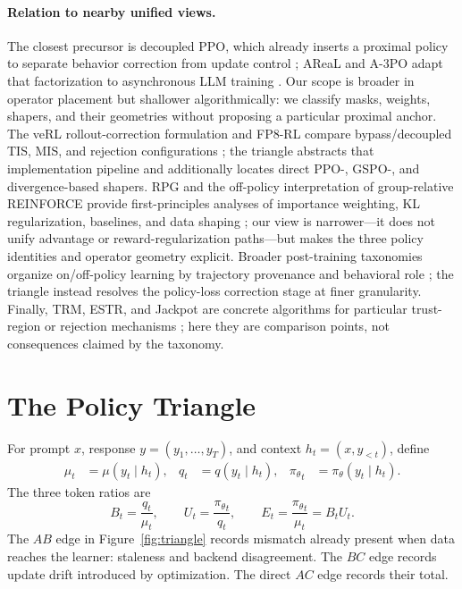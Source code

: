 \documentclass[10pt,twocolumn]{article}
\newcommand{\beh}{\mu}
\newcommand{\prox}{q}
\newcommand{\cur}{\pi_\theta}
\newcommand{\B}{B}
\newcommand{\U}{U}
\newcommand{\E}{E}
\begin{document}
\paragraph{Relation to nearby unified views.}
The closest precursor is decoupled PPO, which already inserts a proximal policy to separate behavior correction from update control \citep{hilton2022batch}; AReaL and A-3PO adapt that factorization to asynchronous LLM training \citep{fu2025areal,li2025a3po}.  Our scope is broader in operator placement but shallower algorithmically: we classify masks, weights, shapers, and their geometries without proposing a particular proximal anchor.  The veRL rollout-correction formulation and FP8-RL compare bypass/decoupled TIS, MIS, and rejection configurations \citep{verl2026rolloutcorr,qiu2026fp8rl}; the triangle abstracts that implementation pipeline and additionally locates direct PPO-, GSPO-, and divergence-based shapers.  RPG and the off-policy interpretation of group-relative REINFORCE provide first-principles analyses of importance weighting, KL regularization, baselines, and data shaping \citep{zhang2025rpg,yao2025offpolicy}; our view is narrower---it does not unify advantage or reward-regularization paths---but makes the three policy identities and operator geometry explicit.  Broader post-training taxonomies organize on/off-policy learning by trajectory provenance and behavioral role \citep{zhao2026unifiedposttraining}; the triangle instead resolves the policy-loss correction stage at finer granularity.  Finally, TRM, ESTR, and Jackpot are concrete algorithms for particular trust-region or rejection mechanisms \citep{li2025trm,zhao2026estr,chen2026jackpot}; here they are comparison points, not consequences claimed by the taxonomy.

\section{The Policy Triangle}
\label{sec:triangle}

For prompt \(x\), response \(y=(y_1,\ldots,y_T)\), and context \(h_t=(x,y_{<t})\), define
\begin{align}
    \beh_t&=\beh(y_t\mid h_t), &
    \prox_t&=\prox(y_t\mid h_t), &
    {\cur}_t&=\cur(y_t\mid h_t).
\end{align}
The three token ratios are
\begin{equation}
    \B_t=\frac{\prox_t}{\beh_t},\qquad
    \U_t=\frac{{\cur}_t}{\prox_t},\qquad
    \E_t=\frac{{\cur}_t}{\beh_t}=\B_t\U_t.
    \label{eq:triangle}
\end{equation}
The \(AB\) edge in Figure~\ref{fig:triangle} records mismatch already present when data reaches the learner: staleness and backend disagreement.  The \(BC\) edge records update drift introduced by optimization.  The direct \(AC\) edge records their total.
\end{document}
